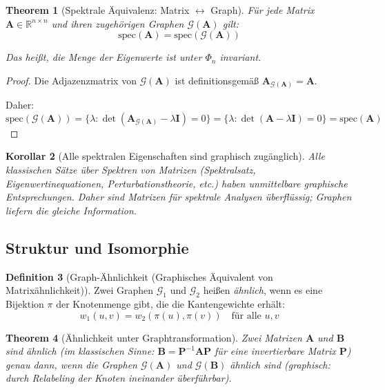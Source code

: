 \documentclass[12pt, a4paper]{article}
\newtheorem{theorem}{Theorem}[section]
\newtheorem{corollary}[theorem]{Korollar}
\theoremstyle{definition}
\newtheorem{definition}[theorem]{Definition}
\theoremstyle{remark}
\newcommand{\R}{\mathbb{R}}
\newcommand{\vA}{\bm{A}}
\newcommand{\vB}{\bm{B}}
\newcommand{\vP}{\bm{P}}
\newcommand{\vI}{\bm{I}}
\newcommand{\Graph}{\mathcal{G}}
\begin{document}
\begin{theorem}[Spektrale Äquivalenz: Matrix $\leftrightarrow$ Graph]
\label{thm:spektrale_aequivalenz}
Für jede Matrix $\vA \in \R^{n \times n}$ und ihren zugehörigen Graphen $\Graph(\vA)$ gilt:
\[
  \mathrm{spec}(\vA) = \mathrm{spec}(\Graph(\vA))
\]

Das heißt, die Menge der Eigenwerte ist unter $\Phi_n$ invariant.
\end{theorem}

\begin{proof}
Die Adjazenzmatrix von $\Graph(\vA)$ ist definitionsgemäß $\vA_{\Graph(\vA)} = \vA$.

Daher:
\[
  \mathrm{spec}(\Graph(\vA)) = \{\lambda : \det(\vA_{\Graph(\vA)} - \lambda \vI) = 0\} = \{\lambda : \det(\vA - \lambda \vI) = 0\} = \mathrm{spec}(\vA)
\]
\end{proof}

\begin{corollary}[Alle spektralen Eigenschaften sind graphisch zugänglich]
\label{cor:spektrale_eigenschaften_graphisch}
Alle klassischen Sätze über Spektren von Matrizen (Spektralsatz, Eigenwertinequationen, Perturbationstheorie, etc.) haben unmittelbare graphische Entsprechungen. Daher sind Matrizen für spektrale Analysen überflüssig; Graphen liefern die gleiche Information.
\end{corollary}

\subsection{Struktur und Isomorphie}
\label{subsec:struktur_isomorphie}

\begin{definition}[Graph-Ähnlichkeit (Graphisches Äquivalent von Matrixähnlichkeit)]
\label{def:graph_aehnlichkeit}
Zwei Graphen $\Graph_1$ und $\Graph_2$ heißen \emph{ähnlich}, wenn es eine Bijektion $\pi$ der Knotenmenge gibt, die die Kantengewichte erhält:
\[
  w_1(u, v) = w_2(\pi(u), \pi(v)) \quad \text{für alle } u, v
\]
\end{definition}

\begin{theorem}[Ähnlichkeit unter Graphtransformation]
\label{thm:graph_aehnlichkeit_invarianz}
Zwei Matrizen $\vA$ und $\vB$ sind ähnlich (im klassischen Sinne: $\vB = \vP^{-1} \vA \vP$ für eine invertierbare Matrix $\vP$) genau dann, wenn die Graphen $\Graph(\vA)$ und $\Graph(\vB)$ ähnlich sind (graphisch: durch Relabeling der Knoten ineinander überführbar).
\end{theorem}
\end{document}
